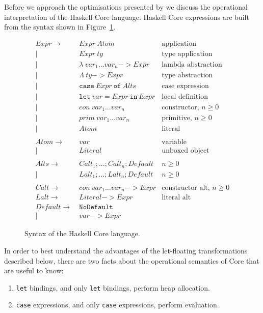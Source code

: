Before we approach the optimisations presented by \citet{jones1996} we discuss the operational interpretation of the Haskell Core language. Haskell Core expressions are built from the syntax shown in Figure~\ref{fig:haskell_core}.

\begin{figure}[h]
\begin{align*}
Expr \to~& Expr~Atom & \text{application}\\
|~& Expr~ty & \text{type application}\\
|~& \lambda~var_1 ... var_n \mathtt{->} Expr & \text{lambda abstraction}\\
|~& \Lambda~ty \mathtt{->} Expr & \text{type abstraction}\\
|~& \mathtt{case}~Expr~\mathtt{of}~Alts & \text{case expression}\\
|~& \mathtt{let}~var\mathtt{=}Expr~\mathtt{in}~Expr & \text{local definition}\\
|~& con~var_1 ... var_n & \text{constructor, $n \geq 0$}\\
|~& prim~var_1 ... var_n & \text{primitive, $n \geq 0$}\\
|~& Atom & \text{literal}\\
\\
Atom \to~& var & \text{variable}\\
|~& Literal & \text{unboxed object}\\
\\
Alts \to~& Calt_1; ...; Calt_n; Default & \text{$n \geq 0$}\\
|~& Lalt_1; ...; Lalt_n; Default & \text{$n \geq 0$}\\
\\
Calt \to~& con~var_1 ... var_n \mathtt{->} Expr & \text{constructor alt, $n \geq 0$}\\
Lalt \to~& Literal \mathtt{->} Expr & \text{literal alt}\\
Default \to~& \mathtt{NoDefault} & \text{}\\
|~& var \mathtt{->} Expr & \text{}
\end{align*}
\caption{Syntax of the Haskell Core language.}
\label{fig:haskell_core}
\end{figure}

In order to best understand the advantages of the let-floating transformations described below, there are two facts about the operational semantics of Core that are useful to know:
\begin{enumerate}
\item \lstinline{let} bindings, and only \lstinline{let} bindings, perform heap allocation.
\item \lstinline{case} expressions, and only \lstinline{case} expressions, perform evaluation.
\end{enumerate}

